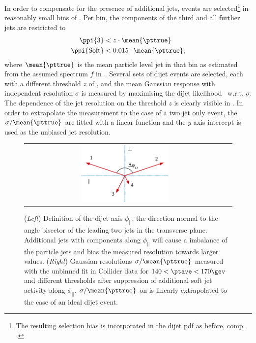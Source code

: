 In order to compensate for the presence of additional jets,
events are selected\footnote{The resulting selection bias is incorporated in the dijet pdf as
before, comp. .} in reasonably small bins of \ptave.
Per bin, the \pp components of the third and all further jets are restricted to
\begin{align}
  \label{eq:ResFit:ThirdJetSelection}
  \begin{split}
    \ppi{3}                & < z\cdot\mean{\pttrue} \\
    \ppi{\text{Soft}}  & < 0.015\cdot\mean{\pttrue},
 \end{split}
\end{align}
where $\mean{\pttrue}$ is the mean particle level jet \pt in that bin
as estimated from the assumed spectrum
$f$ in~.
Several sets of dijet events are selected, each with a different
threshold $z$ of , and the mean Gaussian response with \pt
independent resolution $\sigma$ is measured by maximising the dijet
likelihood~ w.r.t. $\sigma$.
The dependence of the jet \pt resolution on the threshold $z$ is
clearly visible in .
In order to extrapolate the measurement to the case of a two jet only
event, the \mbox{$\sigma/\mean{\pttrue}$} are fitted with a linear
function and the $y$ axis intercept is used as the unbiased jet \pt
resolution.

\begin{figure}[ht]
  \label{fig:ResFit:AddJets:Corr}
  \centering
  \begin{tabular}{cc}
    \includegraphics[width=0.45\textwidth]{figures/Sketch_Projections}
  \end{tabular}
  \caption{(\textit{Left}) Definition of the dijet axis $\phi_{||}$, the direction normal to the
    angle bisector of the leading two jets in the transverse plane.
    Additional jets with \pt components along $\phi_{||}$ will cause
    a \pt imbalance of the particle jets and bias the measured
    resolution towards larger values.
    (\textit{Right}) Gaussian resolutions \mbox{$\sigma/\mean{\pttrue}$} measured with the unbinned
    fit in Collider data for \mbox{$140 < \ptave < 170\gev$} and different 
    thresholds after suppression of additional soft jet activity along
    $\phi_{||}$. 
    \mbox{$\sigma/\mean{\pttrue}$} on  is linearly
    extrapolated to the case of an ideal dijet event.
  }
\end{figure}


